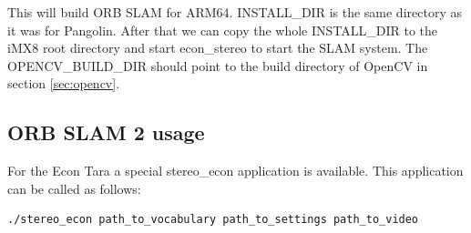 \documentclass[11pt,a4paper,titlepage,oneside]{report}
\begin{document}
This will build ORB SLAM for ARM64. INSTALL\_DIR is the same directory as it was for Pangolin. After that we can copy the whole INSTALL\_DIR to the iMX8 root directory and start econ\_stereo to start the SLAM system. The OPENCV\_BUILD\_DIR should point to the build directory of OpenCV in section \ref{sec:opencv}.

\subsection{ORB SLAM 2 usage}

For the Econ Tara a special stereo\_econ application is available. This application can be called as follows:
\begin{lstlisting}[language=bash]
./stereo_econ path_to_vocabulary path_to_settings path_to_video
\end{lstlisting}
\end{document}
